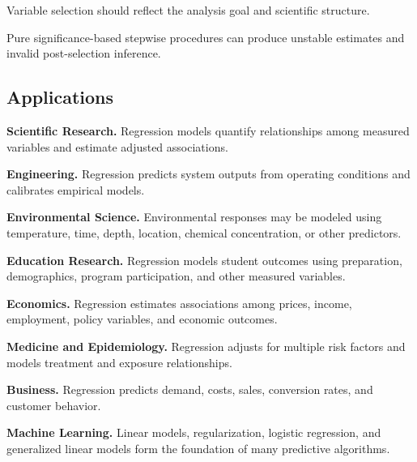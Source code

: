 Variable selection should reflect the analysis goal and scientific
structure.

Pure significance-based stepwise procedures can produce unstable
estimates and invalid post-selection inference.

\subsection{Applications}
\label{subsec:regression-applications}

\begin{applicationbox}

\textbf{Scientific Research.}
Regression models quantify relationships among measured variables and
estimate adjusted associations.

\medskip

\textbf{Engineering.}
Regression predicts system outputs from operating conditions and
calibrates empirical models.

\medskip

\textbf{Environmental Science.}
Environmental responses may be modeled using temperature, time, depth,
location, chemical concentration, or other predictors.

\medskip

\textbf{Education Research.}
Regression models student outcomes using preparation, demographics,
program participation, and other measured variables.

\medskip

\textbf{Economics.}
Regression estimates associations among prices, income, employment,
policy variables, and economic outcomes.

\medskip

\textbf{Medicine and Epidemiology.}
Regression adjusts for multiple risk factors and models treatment and
exposure relationships.

\medskip

\textbf{Business.}
Regression predicts demand, costs, sales, conversion rates, and customer
behavior.

\medskip

\textbf{Machine Learning.}
Linear models, regularization, logistic regression, and generalized
linear models form the foundation of many predictive algorithms.

\end{applicationbox}

